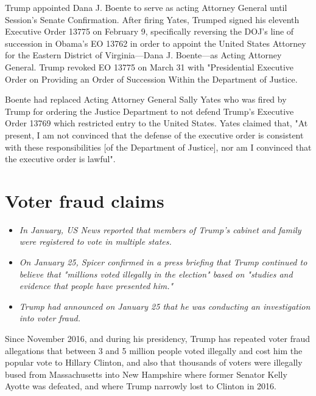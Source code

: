 Trump appointed Dana J. Boente to serve as acting Attorney General until
Session's Senate Confirmation. After firing Yates, Trumped signed his
eleventh Executive Order 13775 on February 9, specifically reversing the
DOJ's line of succession in Obama's EO 13762 in order to appoint the
United States Attorney for the Eastern District of Virginia---Dana J.
Boente---as Acting Attorney General. Trump revoked EO 13775 on March 31
with "Presidential Executive Order on Providing an Order of Succession
Within the Department of Justice.

Boente had replaced Acting Attorney General Sally Yates who was fired by
Trump for ordering the Justice Department to not defend Trump's
Executive Order 13769 which restricted entry to the United States. Yates
claimed that, "At present, I am not convinced that the defense of the
executive order is consistent with these responsibilities {[}of the
Department of Justice{]}, nor am I convinced that the executive order is
lawful".

\section{Voter fraud claims}\label{voter-fraud-claims}

\begin{itemize}
\item
  \emph{In January, US News reported that members of Trump's cabinet and
  family were registered to vote in multiple states.}
\item
  \emph{On January 25, Spicer confirmed in a press briefing that Trump
  continued to believe that "millions voted illegally in the election"
  based on "studies and evidence that people have presented him."}
\item
  \emph{Trump had announced on January 25 that he was conducting an
  investigation into voter fraud.}
\end{itemize}

Since November 2016, and during his presidency, Trump has repeated voter
fraud allegations that between 3 and 5 million people voted illegally
and cost him the popular vote to Hillary Clinton, and also that
thousands of voters were illegally bused from Massachusetts into New
Hampshire where former Senator Kelly Ayotte was defeated, and where
Trump narrowly lost to Clinton in 2016.

